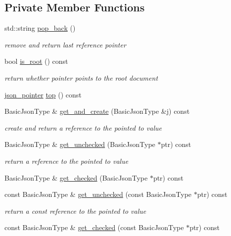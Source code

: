 \subsection*{Private Member Functions}
\begin{DoxyCompactItemize}
\item 
std\+::string \hyperlink{classnlohmann_1_1json__pointer_a4d523606a8b40cef73e976e61b6fd383}{pop\+\_\+back} ()
\begin{DoxyCompactList}\small\item\em remove and return last reference pointer \end{DoxyCompactList}\item 
bool \hyperlink{classnlohmann_1_1json__pointer_aa7cd421aaccabea7ffcf953f7ff96362}{is\+\_\+root} () const
\begin{DoxyCompactList}\small\item\em return whether pointer points to the root document \end{DoxyCompactList}\item 
\hyperlink{classnlohmann_1_1json__pointer}{json\+\_\+pointer} \hyperlink{classnlohmann_1_1json__pointer_a00eff109d9a0091e42ada9b16b90c8d9}{top} () const
\item 
Basic\+Json\+Type \& \hyperlink{classnlohmann_1_1json__pointer_a583c726016f440ffe65553935c101ff5}{get\+\_\+and\+\_\+create} (Basic\+Json\+Type \&j) const
\begin{DoxyCompactList}\small\item\em create and return a reference to the pointed to value \end{DoxyCompactList}\item 
Basic\+Json\+Type \& \hyperlink{classnlohmann_1_1json__pointer_a577512ee6b7f030e8872b4d29fa5c3e5}{get\+\_\+unchecked} (Basic\+Json\+Type $\ast$ptr) const
\begin{DoxyCompactList}\small\item\em return a reference to the pointed to value \end{DoxyCompactList}\item 
Basic\+Json\+Type \& \hyperlink{classnlohmann_1_1json__pointer_a366d68a67e40d86676d3bdb52e167294}{get\+\_\+checked} (Basic\+Json\+Type $\ast$ptr) const
\item 
const Basic\+Json\+Type \& \hyperlink{classnlohmann_1_1json__pointer_ad6a01f8e1556eef68e5a49b33fef1548}{get\+\_\+unchecked} (const Basic\+Json\+Type $\ast$ptr) const
\begin{DoxyCompactList}\small\item\em return a const reference to the pointed to value \end{DoxyCompactList}\item 
const Basic\+Json\+Type \& \hyperlink{classnlohmann_1_1json__pointer_a55a5bbbc3007e479607304a3e8cb9bf5}{get\+\_\+checked} (const Basic\+Json\+Type $\ast$ptr) const
\end{DoxyCompactItemize}
